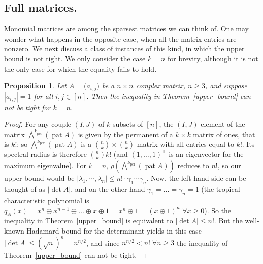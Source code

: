 \documentclass[a4paper]{amsart}
\theoremstyle{definition}
\theoremstyle{plain}
\newtheorem{prop}[thm]{Proposition}
\theoremstyle{remark}
\begin{document}
\subsection{Full matrices.}
Monomial matrices are among the sparsest matrices we can think of.
One may wonder what happens in the opposite case, when all the matrix entries are nonzero. We next discuss a class of instances of this kind,
in which the upper bound is not tight.
We only consider the case $k = n$ for brevity,
although it is not the only case for which the equality fails to hold.
\begin{prop}
Let $A = \bigl(a_{i,j}\bigr)$ be a $n\times n$ complex matrix, $n{\geqslant} 3$,
and suppose ${|a_{i,j}| = 1}$ for all $i,j \in [n]$.
Then the inequality in Theorem~\ref{upper_bound} can not be tight for $k = n$.
\end{prop}
\begin{proof}
For any couple $(I,J)$ of $k$-subsets of $[n]$, the $(I,J)$ element of the matrix $\bigwedge^k_\operatorname{per} (\operatorname{pat} A)$
is given by the permanent of a $k\times k$ matrix of ones, that is $k!$;
so $\bigwedge^k_\operatorname{per} (\operatorname{pat} A)$ is a $\binom{n}{k} \times \binom{n}{k}$ matrix with all entries equal to $k!$.
Its spectral radius is therefore $\binom{n}{k} k!$ (and $(1,\dots,1)^\top$ is an eigenvector for the maximum eigenvalue).
For $k = n$, $\rho(\bigwedge^k_\operatorname{per} (\operatorname{pat} A))$ reduces to $n!$,
so our upper bound would be $|\lambda_1,\dotsm,\lambda_n|{\leqslant} n!\cdot\gamma_1\dotsm\gamma_n$.
Now, the left-hand side can be thought of as $|\det A|$,
and on the other hand $\gamma_1=\dots = \gamma_n = 1$
(the tropical characteristic polynomial is 
$q_A(x) = x^n\oplus x^{n-1}\oplus\dots\oplus x\oplus 1 = x^n\oplus 1 = (x\oplus 1)^n$
$\forall x{\geqslant} 0$).
So the inequality in Theorem~\ref{upper_bound} is equivalent to $|\det A|{\leqslant} n!$.
But the well-known Hadamard bound for the determinant yields in this case $|\det A|{\leqslant}(\sqrt{n})^n = n^{n/2}$,
and since $n^{n/2} < n!\;\forall n{\geqslant} 3$ the inequality of Theorem~\ref{upper_bound} can not be tight.
\end{proof}
\end{document}
